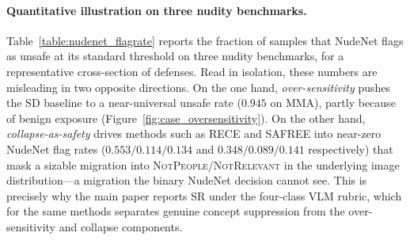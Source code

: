 \paragraph{Quantitative illustration on three nudity benchmarks.}
Table~\ref{table:nudenet_flagrate} reports the fraction of samples that NudeNet flags as unsafe at its standard threshold on three nudity benchmarks, for a representative cross-section of defenses. Read in isolation, these numbers are misleading in two opposite directions. On the one hand, \emph{over-sensitivity} pushes the SD baseline to a near-universal unsafe rate ($0.945$ on MMA), partly because of benign exposure (Figure~\ref{fig:case_oversensitivity}). On the other hand, \emph{collapse-as-safety} drives methods such as RECE and SAFREE into near-zero NudeNet flag rates ($0.553/0.114/0.134$ and $0.348/0.089/0.141$ respectively) that mask a sizable migration into \textsc{NotPeople}/\textsc{NotRelevant} in the underlying image distribution---a migration the binary NudeNet decision cannot see. This is precisely why the main paper reports SR under the four-class VLM rubric, which for the same methods separates genuine concept suppression from the over-sensitivity and collapse components.


